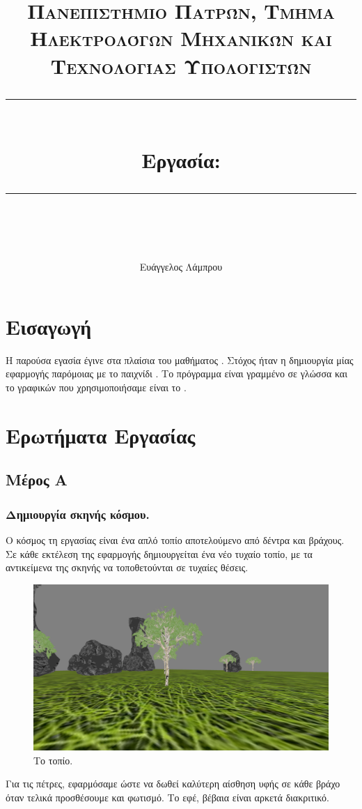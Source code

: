 \documentclass[11pt]{scrartcl} %
\title{	
	\normalfont\normalsize
	\textsc{Πανεπιστήμιο Πατρών, Τμήμα Ηλεκτρολόγων Μηχανικών και Τεχνολογίας Υπολογιστών}\\ %
	\vspace{25pt} %
	\rule{\linewidth}{0.5pt}\\ %
	\vspace{20pt} %
	{\Large Εργασία: \en{Pokemon}}\\ %
	\vspace{12pt} %
	\rule{\linewidth}{2pt}\\ %
	\vspace{12pt} %
}
\author{\LARGE Ευάγγελος Λάμπρου \\ \en{UP1066519}} %
\date{} %
\newenvironment{centerimg}[1]%
{%
    \begin{figure}[H]
        #1
    \begin{center}
}%
{%
    \end{center}
    \end{figure}
}
\begin{document}
\maketitle 

\tableofcontents

\newpage

\section{Εισαγωγή}

Η παρούσα εγασία έγινε στα πλαίσια του μαθήματος . Στόχος ήταν 
η δημιουργία μίας εφαρμογής παρόμοιας με το παιχνίδι . Το πρόγραμμα είναι γραμμένο σε γλώσσα 
και το  γραφικών που χρησιμοποιήσαμε είναι το .

\section{Ερωτήματα Εργασίας}

\subsection{Μέρος Α}

\subsubsection{Δημιουργία σκηνής κόσμου.}

Ο κόσμος τη εργασίας είναι ένα απλό τοπίο αποτελούμενο από δέντρα και βράχους. Σε κάθε εκτέλεση της εφαρμογής
δημιουργείται ένα νέο τυχαίο τοπίο, με τα αντικείμενα της σκηνής να τοποθετούνται σε τυχαίες θέσεις. 

\begin{centerimg}{\caption{Το τοπίο.}}
    \includegraphics[width=.7\textwidth]{./assets/scene.png}
\end{centerimg}

Για τις πέτρες, εφαρμόσαμε  
ώστε να δωθεί καλύτερη αίσθηση υφής σε κάθε βράχο όταν 
τελικά προσθέσουμε και φωτισμό. Το εφέ, βέβαια 
είναι αρκετά διακριτικό.
\end{document}

